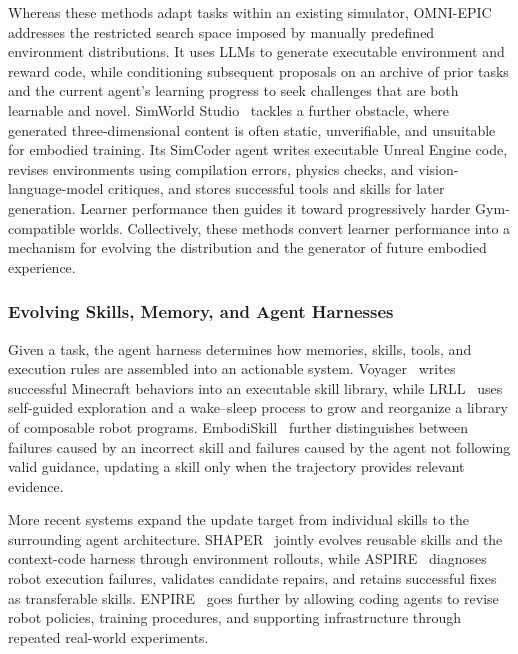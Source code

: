 Whereas these methods adapt tasks within an existing simulator, OMNI-EPIC~\cite{faldor2024omni} addresses the restricted search space imposed by manually predefined environment distributions. It uses LLMs to generate executable environment and reward code, while conditioning subsequent proposals on an archive of prior tasks and the current agent's learning progress to seek challenges that are both learnable and novel. 
SimWorld Studio~\cite{kang2026simworld} tackles a further obstacle, where generated three-dimensional content is often static, unverifiable, and unsuitable for embodied training. Its SimCoder agent writes executable Unreal Engine code, revises environments using compilation errors, physics checks, and vision-language-model critiques, and stores successful tools and skills for later generation. Learner performance then guides it toward progressively harder Gym-compatible worlds. Collectively, these methods convert learner performance into a mechanism for evolving the distribution and the generator of future embodied experience.


\subsubsection{Evolving Skills, Memory, and Agent Harnesses}

Given a task, the agent harness determines how memories, skills, tools, and execution rules are assembled into an actionable system. Voyager~\cite{wang2023voyager} writes successful Minecraft behaviors into an executable skill library, while LRLL~\cite{tziafas2024lrll} uses self-guided exploration and a wake--sleep process to grow and reorganize a library of composable robot programs. EmbodiSkill~\cite{ju2026embodiskill} further distinguishes between failures caused by an incorrect skill and failures caused by the agent not following valid guidance, updating a skill only when the trajectory provides relevant evidence. 

More recent systems expand the update target from individual skills to the surrounding agent architecture. SHAPER~\cite{wang2026shaper} jointly evolves reusable skills and the context-code harness through environment rollouts, while ASPIRE~\cite{lu2026aspire} diagnoses robot execution failures, validates candidate repairs, and retains successful fixes as transferable skills. ENPIRE~\cite{xiao2026enpire} goes further by allowing coding agents to revise robot policies, training procedures, and supporting infrastructure through repeated real-world experiments. 

